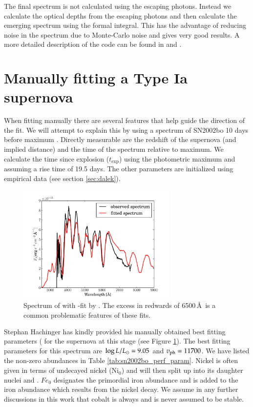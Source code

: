 The final spectrum is not calculated using the escaping photons. Instead we calculate the optical depths from the escaping photons and then calculate the emerging spectrum using the formal integral. 
This has the advantage of reducing noise in the spectrum due to Monte-Carlo noise and gives very good results. A more detailed description of the code can be found in  \citet{1993A&A...279..447M} and \citet{2000A&A...363..705M}.


\section{Manually fitting a Type Ia supernova}
\label{sec:manual_sneia}
When fitting manually there are several features that help guide the direction of the fit. We will attempt to explain this by using a spectrum of SN2002bo 10 days before maximum \citep{2004MNRAS.348..261B}. 
Directly measurable are the redshift of the supernova (and implied distance) and the time of the spectrum relative to maximum. We calculate the time since explosion ($t_\textrm{exp}$) using the photometric maximum and assuming a rise time of 19.5 days.
The other parameters are initialized using empirical data (see section \ref{sec:dalek}). 

\begin{figure}[htbp] %
   \centering
   \includegraphics[width=0.7\textwidth]{chapter_dalek/plots/bf2002bo-10.pdf} 
   \caption{Spectrum of  \citep{2004MNRAS.348..261B} with \mlc-fit by \citet{hachinger_dipl2007}. The excess in redwards of 6500\,\AA\ is a common problematic features of these fits.}
   \label{fig:sn2002bo-10_bf}
\end{figure}

Stephan Hachinger has kindly provided his manually obtained best fitting parameters ( for the supernova at this stage (see Figure \ref{fig:sn2002bo-10_bf}).
The best fitting parameters for this spectrum are $\log{L/L_\odot}=9.05$ and $v_{\rm ph}=11700$. We have listed the non-zero abundances in Table \ref{tab:sn2002bo_perf_param}. Nickel is often given in terms of undecayed nickel ($\textrm{Ni}_0$) and will then split up into its daughter nuclei \Co and \Fe. $Fe_0$ designates the primordial iron abundance and is added to the iron abundance which results from the  nickel decay. We assume in any further discussions in this work that cobalt is always \Co and is never assumed to be stable. 


